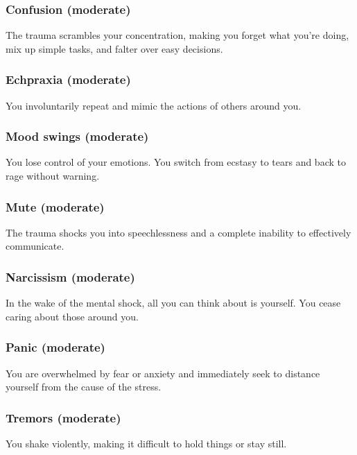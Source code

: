 \subsubsection{Confusion (moderate)} 

The trauma scrambles your concentration, making you forget what you’re doing, mix up simple tasks, and falter over easy decisions. 

\subsubsection{Echpraxia (moderate)} 

You involuntarily repeat and mimic the actions of others around you. 

\subsubsection{Mood swings (moderate)} 

You lose control of your emotions. You switch from ecstasy to tears and back to rage without warning. 

\subsubsection{Mute (moderate)} 

The trauma shocks you into speechlessness and a complete inability to effectively communicate. 

\subsubsection{Narcissism (moderate)} 

In the wake of the mental shock, all you can think about is yourself. You cease caring about those around you. 

\subsubsection{Panic (moderate)} 

You are overwhelmed by fear or anxiety and immediately seek to distance yourself from the cause of the stress. 

\subsubsection{Tremors (moderate)} 

You shake violently, making it difficult to hold things or stay still. 

